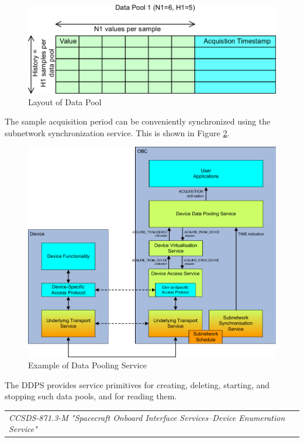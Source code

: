 \begin{figure}[h]
\centering\includegraphics[scale=0.3]{fig/layout_of_data_pool}
\caption{Layout of Data Pool}
\label{fig:Layout of Data Pool}
\end{figure}

The sample acquisition period can be conveniently synchronized using the subnetwork synchronization service. This is shown in Figure \ref{fig:Example of Data Pooling Service}.

\begin{figure}[h]
\centering\includegraphics[scale=0.3]{fig/example_of_data_pooling_service}
\caption{Example of Data Pooling Service}
\label{fig:Example of Data Pooling Service}
\end{figure}

The DDPS provides service primitives for creating, deleting, starting, and stopping such data pools, and for reading them.

\begin{tabular}{l}
\textit{CCSDS-871.3-M "Spacecraft Onboard Interface Services--Device Enumeration Service" \cite{}} 
\end{tabular}

